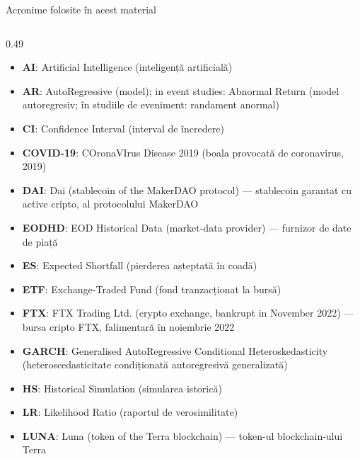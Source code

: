 
{
\begin{frame}[noframenumbering]
    \titlepage
\end{frame}
}
\begin{frame}{Acronime folosite în acest material}
\begin{columns}[T]
\begin{column}{0.49\textwidth}
\begin{itemize}\setlength{\itemsep}{0pt}
    \item \textbf{AI}: Artificial Intelligence (inteligență artificială)
    \item \textbf{AR}: AutoRegressive (model); in event studies: Abnormal Return (model autoregresiv; în studiile de eveniment: randament anormal)
    \item \textbf{CI}: Confidence Interval (interval de încredere)
    \item \textbf{COVID-19}: COronaVIrus Disease 2019 (boala provocată de coronavirus, 2019)
    \item \textbf{DAI}: Dai (stablecoin of the MakerDAO protocol) — stablecoin garantat cu active cripto, al protocolului MakerDAO
    \item \textbf{EODHD}: EOD Historical Data (market-data provider) — furnizor de date de piață
    \item \textbf{ES}: Expected Shortfall (pierderea așteptată în coadă)
    \item \textbf{ETF}: Exchange-Traded Fund (fond tranzacționat la bursă)
    \item \textbf{FTX}: FTX Trading Ltd. (crypto exchange, bankrupt in November 2022) — bursa cripto FTX, falimentară în noiembrie 2022
    \item \textbf{GARCH}: Generalised AutoRegressive Conditional Heteroskedasticity (heteroscedasticitate condiționată autoregresivă generalizată)
    \item \textbf{HS}: Historical Simulation (simularea istorică)
    \item \textbf{LR}: Likelihood Ratio (raportul de verosimilitate)
    \item \textbf{LUNA}: Luna (token of the Terra blockchain) — token-ul blockchain-ului Terra
\end{itemize}
\end{column}

\end{columns}
\end{frame}
